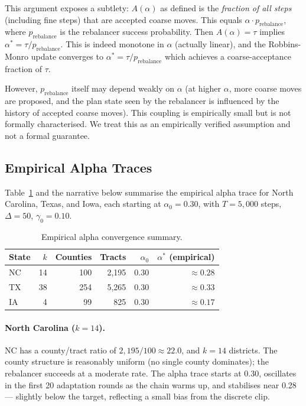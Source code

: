 This argument exposes a subtlety: $A(\alpha)$ as defined is the
\emph{fraction of all steps} (including fine steps) that are accepted coarse
moves.
This equals $\alpha \cdot p_{\text{rebalance}}$, where $p_{\text{rebalance}}$
is the rebalancer success probability.
Then $A(\alpha) = \tau$ implies $\alpha^* = \tau / p_{\text{rebalance}}$.
This is indeed monotone in $\alpha$ (actually linear), and the Robbins-Monro
update converges to $\alpha^* = \tau / p_{\text{rebalance}}$ which achieves
a coarse-acceptance fraction of $\tau$.

However, $p_{\text{rebalance}}$ itself may depend weakly on $\alpha$ (at
higher $\alpha$, more coarse moves are proposed, and the plan state seen by
the rebalancer is influenced by the history of accepted coarse moves).
This coupling is empirically small but is not formally characterised.
We treat this as an empirically verified assumption and not a formal guarantee.

\subsection{Empirical Alpha Traces}

Table~\ref{tab:alpha-convergence} and the narrative below summarise the
empirical alpha trace for North Carolina, Texas, and Iowa, each starting at
$\alpha_0 = 0.30$, with $T = 5{,}000$ steps, $\Delta = 50$, $\gamma_0 = 0.10$.

\begin{table}[h]
  \centering
  \caption{Empirical alpha convergence summary.}
  \label{tab:alpha-convergence}
  \begin{tabular}{lrrrrr}
    \toprule
    State & $k$ & Counties & Tracts & $\alpha_0$ & $\alpha^*$ (empirical) \\
    \midrule
    NC & 14 & 100 & 2{,}195 & 0.30 & $\approx 0.28$ \\
    TX & 38 & 254 & 5{,}265 & 0.30 & $\approx 0.33$ \\
    IA &  4 &  99 &   825 & 0.30 & $\approx 0.17$ \\
    \bottomrule
  \end{tabular}
\end{table}

\paragraph{North Carolina ($k = 14$).}
NC has a county/tract ratio of $2{,}195 / 100 \approx 22.0$, and $k = 14$
districts.
The county structure is reasonably uniform (no single county dominates);
the rebalancer succeeds at a moderate rate.
The alpha trace starts at 0.30, oscillates in the first 20 adaptation rounds
as the chain warms up, and stabilises near 0.28 --- slightly below the target,
reflecting a small bias from the discrete clip.

